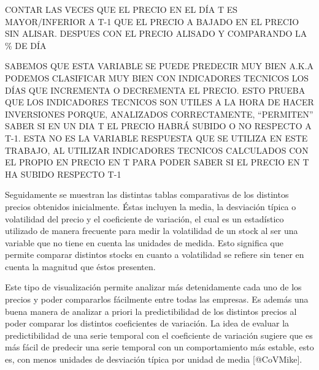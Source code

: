 \documentclass[]{article}
\begin{document}
CONTAR LAS VECES QUE EL PRECIO EN EL DÍA T ES MAYOR/INFERIOR A T-1 QUE
EL PRECIO A BAJADO EN EL PRECIO SIN ALISAR. DESPUES CON EL PRECIO
ALISADO Y COMPARANDO LA \% DE DÍA

SABEMOS QUE ESTA VARIABLE SE PUEDE PREDECIR MUY BIEN A.K.A PODEMOS
CLASIFICAR MUY BIEN CON INDICADORES TECNICOS LOS DÍAS QUE INCREMENTA O
DECREMENTA EL PRECIO. ESTO PRUEBA QUE LOS INDICADORES TECNICOS SON
UTILES A LA HORA DE HACER INVERSIONES PORQUE, ANALIZADOS CORRECTAMENTE,
``PERMITEN'' SABER SI EN UN DIA T EL PRECIO HABRÁ SUBIDO O NO RESPECTO A
T-1. ESTA NO ES LA VARIABLE RESPUESTA QUE SE UTILIZA EN ESTE TRABAJO, AL
UTILIZAR INDICADORES TECNICOS CALCULADOS CON EL PROPIO EN PRECIO EN T
PARA PODER SABER SI EL PRECIO EN T HA SUBIDO RESPECTO T-1

Seguidamente se muestran las distintas tablas comparativas de los
distintos precios obtenidos inicialmente. Éstas incluyen la media, la
desviación típica o volatilidad del precio y el coeficiente de
variación, el cual es un estadístico utilizado de manera frecuente para
medir la volatilidad de un stock al ser una variable que no tiene en
cuenta las unidades de medida. Esto significa que permite comparar
distintos stocks en cuanto a volatilidad se refiere sin tener en cuenta
la magnitud que éstos presenten.

Este tipo de visualización permite analizar más detenidamente cada uno
de los precios y poder compararlos fácilmente entre todas las empresas.
Es además una buena manera de analizar a priori la predictibilidad de
los distintos precios al poder comparar los distintos coeficientes de
variación. La idea de evaluar la predictibilidad de una serie temporal
con el coeficiente de variación sugiere que es más fácil de predecir una
serie temporal con un comportamiento más estable, esto es, con menos
unidades de desviación típica por unidad de media {[}@CoVMike{]}.
\end{document}
